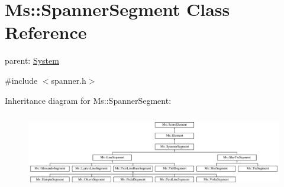 \hypertarget{class_ms_1_1_spanner_segment}{}\section{Ms\+:\+:Spanner\+Segment Class Reference}
\label{class_ms_1_1_spanner_segment}


parent\+: \hyperlink{class_ms_1_1_system}{System}  




{\ttfamily \#include $<$spanner.\+h$>$}

Inheritance diagram for Ms\+:\+:Spanner\+Segment\+:\begin{figure}[H]
\begin{center}
\leavevmode
\includegraphics[height=3.373494cm]{class_ms_1_1_spanner_segment}
\end{center}
\end{figure}
